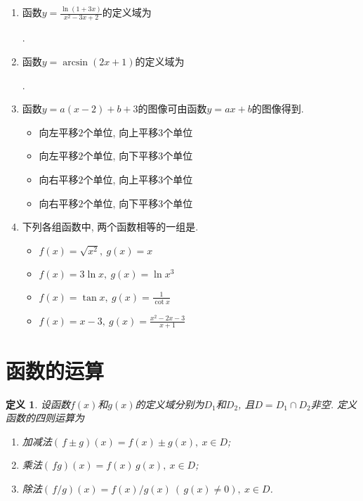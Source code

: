 \documentclass[a4paper,punct=CCT]{ctexbook}
\theoremstyle{break}
\newtheorem*{definition*}{定义}
\newif\ifshowsol
\let\leq\leqslant
\let\le\leq
\begin{document}
\begin{enumerate}
\item 函数\(\displaystyle y = \frac{\ln(1+3x)}{x^2-3x+2}\)的定义域为
  \ifshowsol
  \uline{\makebox[13em]{\(\brce{x \mid x > -1/3, x \ne 1, x \ne 2}\)}}.
  \else
  \uline{\makebox[13em]{}}.
  \fi

\item 函数\(y = \arcsin(2x+1)\)的定义域为
  \ifshowsol
  \uline{\makebox[9em]{\(\brce{x \mid -1/2 \le x \le 0}\)}}.
  \else
  \uline{\makebox[9em]{}}.
  \fi

\item 函数\(y = a(x-2) + b + 3\)的图像可由函数\(y = ax + b\)的图像\uline{\makebox[4em]{}}得到.
  \begin{itemize}
    \renewcommand{\labelitemi}{\faCircleThin}
  \item 向左平移\(2\)个单位, 向上平移\(3\)个单位
  \item 向左平移\(2\)个单位, 向下平移\(3\)个单位
    \ifshowsol
  \item[\faCircle] 向右平移\(2\)个单位, 向上平移\(3\)个单位
    \else
  \item 向右平移\(2\)个单位, 向上平移\(3\)个单位
    \fi
  \item 向右平移\(2\)个单位, 向下平移\(3\)个单位
  \end{itemize}

\item 下列各组函数中, 两个函数相等的一组是\uline{\makebox[4em]{}}.
  \begin{itemize}
    \renewcommand{\labelitemi}{\faCircleThin}
  \item \(f(x) = \sqrt{x^2},\ g(x) = x\)
    \ifshowsol
  \item[\faCircle] \(f(x) = 3\ln x,\ g(x) = \ln x^3\)
    \else
  \item \(f(x) = 3\ln x,\ g(x) = \ln x^3\)
    \fi
  \item \(f(x) = \tan x,\ g(x) = \frac1{\cot x}\)
  \item \(f(x) = x - 3,\ g(x) = \frac{x^2-2x-3}{x+1}\)
  \end{itemize}
\end{enumerate}
\fi

\section{函数的运算}

\begin{definition*}
  设函数\(f(x)\)和\(g(x)\)的定义域分别为\(D_1\)和\(D_2\), 且\(D = D_1 \cap D_2\)非空.  定义函数的四则运算为
  \begin{enumerate}
    \renewcommand{\labelenumi}{(\arabic{enumi})}
  \item 加减法\((\,f \pm g)(x) = f(x) \pm g(x),\ x \in D\);
  \item 乘法\((\,fg)(x) = f(x) \, g(x),\ x \in D\);
  \item 除法\((\,f/g)(x) = f(x) / g(x)\ (\,g(x) \ne 0),\ x \in D\).
  \end{enumerate}
\end{definition*}
\end{document}

